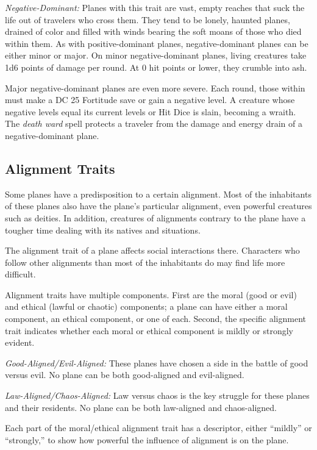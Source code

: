 \documentclass{article}
\begin{document}
\textit{Negative-Dominant:} Planes with this trait are vast, empty reaches that 
suck the life out of travelers who cross them. They tend to be lonely, haunted 
planes, drained of color and filled with winds bearing the soft moans of those 
who died within them. As with positive-dominant planes, negative-dominant planes 
can be either minor or major. On minor negative-dominant planes, living creatures 
take 1d6 points of damage per round. At 0 hit points or lower, they crumble into 
ash.

Major negative-dominant planes are even more severe. Each round, those within must 
make a DC 25 Fortitude save or gain a negative level. A creature whose negative 
levels equal its current levels or Hit Dice is slain, becoming a wraith. The \textit{death 
ward }spell protects a traveler from the damage and energy drain of a negative-dominant 
plane.

\vspace{12pt}
\subsection*{Alignment Traits}

Some planes have a predisposition to a certain alignment. Most of the inhabitants 
of these planes also have the plane's particular alignment, even powerful creatures 
such as deities. In addition, creatures of alignments contrary to the plane have 
a tougher time dealing with its natives and situations.

The alignment trait of a plane affects social interactions there. Characters who 
follow other alignments than most of the inhabitants do may find life more difficult.

Alignment traits have multiple components. First are the moral (good or evil) and 
ethical (lawful or chaotic) components; a plane can have either a moral component, 
an ethical component, or one of each. Second, the specific alignment trait indicates 
whether each moral or ethical component is mildly or strongly evident.

\textit{Good-Aligned/Evil-Aligned: }These planes have chosen a side in the battle 
of good versus evil. No plane can be both good-aligned and evil-aligned.

\textit{Law-Aligned/Chaos-Aligned:} Law versus chaos is the key struggle for these 
planes and their residents. No plane can be both law-aligned and chaos-aligned.

\vspace{12pt}
Each part of the moral/ethical alignment trait has a descriptor, either ``mildly'' 
or ``strongly,'' to show how powerful the influence of alignment is on the plane.
\end{document}
